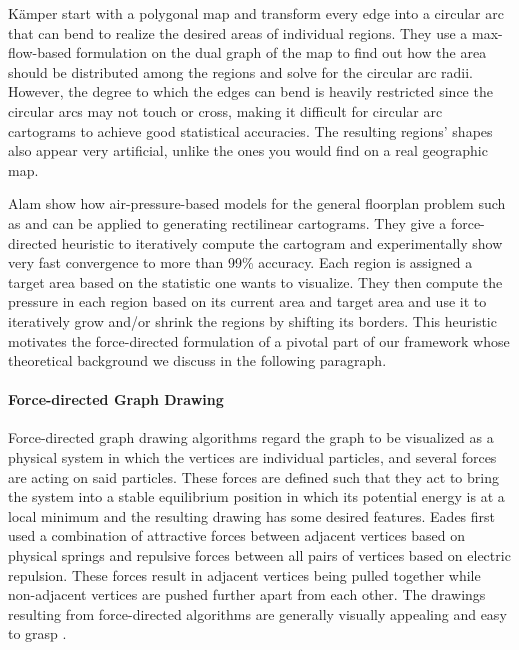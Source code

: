 Kämper \etal{} \cite{kamper2013circular} start with a polygonal map and transform every edge into a circular arc that can bend to realize the desired areas of individual regions.
They use a max-flow-based formulation on the dual graph of the map to find out how the area should be distributed among the regions and solve for the circular arc radii.
However, the degree to which the edges can bend is heavily restricted since the circular arcs may not touch or cross, making it difficult for circular arc cartograms to achieve good statistical accuracies.
The resulting regions' shapes also appear very artificial, unlike the ones you would find on a real geographic map.

Alam \etal{} \cite{alam2013computing} show how air-pressure-based models for the general floorplan problem such as \cite{izumi1998air} and \cite{felsner2013exploiting} can be applied to generating rectilinear cartograms.
They give a force-directed heuristic to iteratively compute the cartogram and experimentally show very fast convergence to more than 99\% accuracy.
Each region is assigned a target area based on the statistic one wants to visualize.
They then compute the pressure in each region based on its current area and target area and use it to iteratively grow and/or shrink the regions by shifting its borders.
This heuristic motivates the force-directed formulation of a pivotal part of our framework whose theoretical background we discuss in the following paragraph.


\paragraph{Force-directed Graph Drawing}

Force-directed graph drawing algorithms regard the graph to be visualized as a physical system in which the vertices are individual particles, and several forces are acting on said particles.
These forces are defined such that they act to bring the system into a stable equilibrium position in which its potential energy is at a local minimum and the resulting drawing has some desired features.
Eades \cite{eades84heuristic} first used a combination of attractive forces between adjacent vertices based on physical springs and repulsive forces between all pairs of vertices based on electric repulsion.
These forces result in adjacent vertices being pulled together while non-adjacent vertices are pushed further apart from each other.
The drawings resulting from force-directed algorithms are generally visually appealing and easy to grasp \cite{kobourov2013force}.

